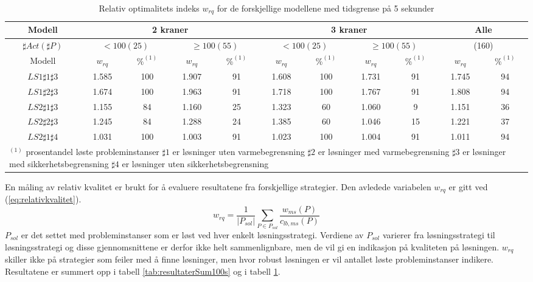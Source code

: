 \begin{table}[!h]
\caption{Relativ optimalitets indeks $w_{rq}$ for de forskjellige modellene med tidsgrense på 5 sekunder}
\begin{center}
\begin{tabular}{ | c | c | c | c | c | c | c | c | c | c | c | }
\hline
\textbf{Modell} & \multicolumn{4}{|c|}{\textbf{2 kraner}} & \multicolumn{4}{|c|}{\textbf{3 kraner}} & \multicolumn{2}{|c|}{\textbf{Alle}} \\ \hline
$\sharp Act(\sharp P)$ & \multicolumn{2}{|c|}{$< 100 (25)$} & \multicolumn{2}{|c|}{$\ge 100 (55)$} & \multicolumn{2}{|c|}{$< 100 (25)$} & \multicolumn{2}{|c|}{$\ge 100 (55)$} & \multicolumn{2}{|c|}{(160)} \\ 
\hline
Modell & $w_{rq}$ & $\%^{(1)}$ & $w_{rq}$ & $\%^{(1)}$  & $w_{rq}$ & $\%^{(1)}$ & $w_{rq}$ & $\%^{(1)}$ & $w_{rq}$ & $\%^{(1)}$ \\ \hline
$LS1 \sharp 1\sharp 3$ & 1.585 & 100 & 1.907 & 91 & 1.608 & 100 & 1.731 & 91 & 1.745 & 94 \\
$LS1 \sharp 2\sharp 3$ & 1.674 & 100 & 1.963 & 91 & 1.718 & 100 & 1.767 & 91 & 1.808 & 94 \\
$LS2 \sharp 1\sharp 3$ & 1.155 & 84 & 1.160 & 25 & 1.323 & 60 & 1.060 & 9 & 1.151 & 36 \\
$LS2 \sharp 2\sharp 3$ & 1.245 & 84 & 1.288 & 24 & 1.385 & 60 & 1.046 & 15 & 1.221 & 37 \\
$LS2 \sharp 1\sharp 4$ & 1.031 & 100 & 1.003 & 91 & 1.023 & 100 & 1.004 & 91 & 1.011 & 94 \\
\hline
\multicolumn{11}{l}{\begin{minipage}{6in}$^{(1)}$ prosentandel løste probleminstanser\newline
$\sharp 1$ er løsninger uten varmebegrensning\newline
$\sharp 2$ er løsninger med varmebegrensning \newline
$\sharp 3$ er løsninger med sikkerhetsbegrensning \newline
$\sharp 4$ er løsninger uten sikkerhetsbegrensning\end{minipage}}
\end{tabular}
\end{center}
\label{tab:resultaterSum5s}
\end{table}

En måling av relativ kvalitet er brukt for å evaluere resultatene fra forskjellige strategier. Den avledede variabelen $w_{rq}$ er gitt ved (\ref{eq:relativkvalitet}).
\begin{equation}
w_{rq} = \frac{1}{| P_{sol} |} \sum_{P \in P_{sol}} \frac{w_{ms}(P)}{c_{lb,ms}(P)}
\label{eq:relativkvalitet}
\end{equation}
$P_{sol}$ er det settet med probleminstanser som er løst ved hver enkelt løsningsstrategi. Verdiene av $P_{sol}$ varierer fra løsningsstrategi til løsningsstrategi og disse gjennomsnittene er derfor ikke helt sammenlignbare, men de vil gi en indikasjon på kvaliteten på løsningen. $w_{rq}$ skiller ikke på strategier som feiler med å finne løsninger, men hvor robust løsningen er vil antallet løste probleminstanser indikere. Resultatene er summert opp i tabell \ref{tab:resultaterSum100s} og i tabell \ref{tab:resultaterSum5s}.

